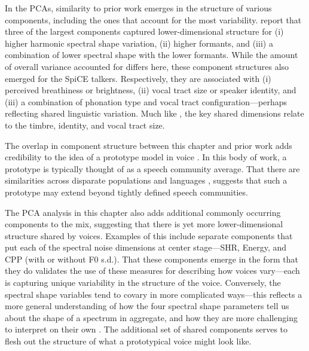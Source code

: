 In the PCAs, similarity to prior work emerges in the structure of various components, including the ones that account for the most variability. \citet{lee_2019_acoustic} report that three of the largest components captured lower-dimensional structure for (i) higher harmonic spectral shape variation, (ii) higher formants, and (iii) a combination of lower spectral shape with the lower formants. While the amount of overall variance accounted for differs here, these component structures also emerged for the SpiCE talkers. Respectively, they are associated with (i) perceived breathiness or brightness, (ii) vocal tract size or speaker identity, and (iii) a combination of phonation type and vocal tract configuration---perhaps reflecting shared linguistic variation. Much like \citet{lee_2019_acoustic}, the key shared dimensions relate to the timbre, identity, and vocal tract size. 

The overlap in component structure between this chapter and prior work \citep{lee_2019_acoustic,lee_2019_spontaneous,lee_2020_language} adds credibility to the idea of a prototype model in voice \citep{lavner_2001_prototype, latinus_2011_voice}. In this body of work, a prototype is typically thought of as a speech community average. That there are similarities across disparate populations and languages \citep[e.g., this chapter and][]{lee_2020_language}, suggests that such a prototype may extend beyond tightly defined speech communities. 

The PCA analysis in this chapter also adds additional commonly occurring components to the mix, suggesting that there is yet more lower-dimensional structure shared by voices. Examples of this include separate components that put each of the spectral noise dimensions at center stage---SHR, Energy, and CPP (with or without F0 s.d.). That these components emerge in the form that they do validates the use of these measures for describing how voices vary---each is capturing unique variability in the structure of the voice. Conversely, the spectral shape variables tend to covary in more complicated ways---this reflects a more general understanding of how the four spectral shape parameters tell us about the shape of a spectrum in aggregate, and how they are more challenging to interpret on their own \citep{garellek_2019_voice}. The additional set of shared components serves to flesh out the structure of what a prototypical voice might look like. 

